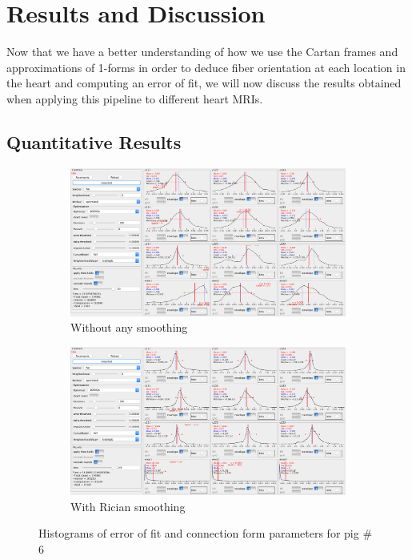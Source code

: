 \newcommand{\degree}{^{\circ}}

\chapter{Results and Discussion}

Now that we have a better understanding of how we use the Cartan frames and approximations of 1-forms in order to deduce fiber orientation at each location in the heart and computing an error of fit, we will now discuss the results obtained when applying this pipeline to different heart MRIs.

\section{Quantitative Results}

\begin{figure}
    \centering
    \begin{subfigure}{1\textwidth}
        \centering
        \includegraphics[width=\textwidth]{figures/histogram_pig6_no_smooth}
        \caption{Without any smoothing}
        \label{fig:histogram_pig6_no_smooth}
    \end{subfigure}
    \begin{subfigure}{1\textwidth}
        \centering
        \includegraphics[width=\textwidth]{figures/histogram_pig6_smooth}
        \caption{With Rician smoothing}
        \label{fig:histogram_pig6_smooth}
    \end{subfigure}
    \caption{Histograms of error of fit and connection form parameters for pig \# 6}
    \label{histo_pig6}
\end{figure}

